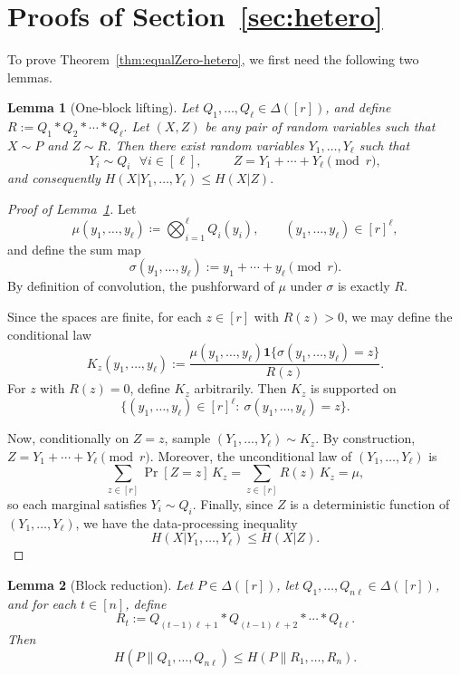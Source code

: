 \documentclass[journal]{IEEEtran}
\newtheorem{lemma}{Lemma}
\newcommand{\1}{\mathbf{1}}
\begin{document}
\section{Proofs of Section~\ref{sec:hetero}}\label{app:secHetero}
To prove Theorem~\ref{thm:equalZero-hetero}, we first need the following two lemmas. 
\begin{lemma}[One-block lifting]
\label{lem:one-block-lifting}
Let \(Q_1,\dots,Q_\ell\in\Delta([r])\), and define
\(R:=Q_1 * Q_2 * \cdots * Q_\ell.\)
Let \((X,Z)\) be any pair of random variables such that \(X\sim P\) and \(Z\sim R\).
Then there exist random variables \(Y_1,\dots,Y_\ell\) such that
\[Y_i\sim Q_i~~~ \forall i\in[\ell],\qquad~~ Z=Y_1+\cdots+Y_\ell \pmod r,\]
and consequently
\(H(X|Y_1,\dots,Y_\ell)\le H(X|Z).\)
\end{lemma}

\begin{proof}[Proof of Lemma~\ref{lem:one-block-lifting}]
Let
\[
\mu(y_1,\dots,y_\ell)\coloneqq \bigotimes_{i=1}^\ell Q_i(y_i),
\qquad (y_1,\dots,y_\ell)\in[r]^\ell,
\]
and define the sum map
\[
\sigma(y_1,\dots,y_\ell):=y_1+\cdots+y_\ell \pmod r.
\]
By definition of convolution, the pushforward of \(\mu\) under \(\sigma\) is exactly \(R\).

Since the spaces are finite, for each \(z\in[r]\) with \(R(z)>0\), we may define the conditional law
\[
K_z(y_1,\dots,y_\ell)
:=
\frac{\mu(y_1,\dots,y_\ell)\mathbf 1\{\sigma(y_1,\dots,y_\ell)=z\}}{R(z)}.
\]
For \(z\) with \(R(z)=0\), define \(K_z\) arbitrarily. Then \(K_z\) is supported on
\[
\{(y_1,\dots,y_\ell)\in[r]^\ell:\ \sigma(y_1,\dots,y_\ell)=z\}.
\]

Now, conditionally on \(Z=z\), sample \((Y_1,\dots,Y_\ell)\sim K_z\). By construction,
\(Z=Y_1+\cdots+Y_\ell \pmod r.\)
Moreover, the unconditional law of \((Y_1,\dots,Y_\ell)\) is
\[
\sum_{z\in[r]} \Pr[Z=z]\,K_z
=
\sum_{z\in[r]} R(z)\,K_z
=
\mu,
\]
so each marginal satisfies \(Y_i\sim Q_i\). 
Finally, since \(Z\) is a deterministic function of \((Y_1,\dots,Y_\ell)\), we have the data-processing inequality
\[
H(X| Y_1,\dots,Y_\ell)\le H(X| Z).
\]
\end{proof}


\begin{lemma}[Block reduction]
\label{lem:block-reduction}
Let \(P\in\Delta([r])\), let \(Q_1,\dots,Q_{n\ell}\in\Delta([r])\), and for each \(t\in[n]\), define
\[
R_t:=Q_{(t-1)\ell+1} * Q_{(t-1)\ell+2} * \cdots * Q_{t\ell}.
\]
Then
\[
H(P\|Q_1,\dots,Q_{n\ell})
\le
H(P\|R_1,\dots,R_n).
\]
\end{lemma}
\end{document}
